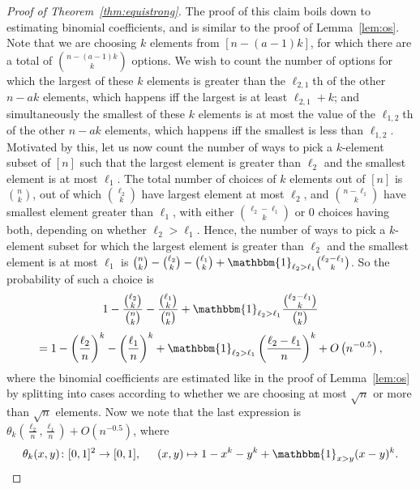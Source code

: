 \documentclass{amsart}
\theoremstyle{definition}
\begin{document}
\begin{proof}[Proof of Theorem~\ref{thm:equistrong}]
The proof of this claim boils down to estimating binomial coefficients, and is similar to the proof of Lemma~\ref{lem:os}. Note that we are choosing $k$ elements from $[n-(a-1)k]$, for which there are a total of $\binom{n-(a-1)k}{k}$ options. We wish to count the number of options for which the largest of these $k$ elements is greater than the $\ell_{2,1}$th of the other $n-ak$ elements, which happens iff the largest is at least $\ell_{2,1}+k$; and simultaneously the smallest of these $k$ elements is at most the value of the $\ell_{1,2}$th of the other $n-ak$ elements, which happens iff the smallest is less than $\ell_{1,2}$. Motivated by this, let us now count the number of ways to pick a $k$-element subset of $[n]$ such that the largest element is greater than $\ell_2$ and the smallest element is at most $\ell_1$. The total number of choices of $k$ elements out of $[n]$ is $\binom{n}{k}$, out of which $\binom{\ell_2}{k}$ have largest element at most $\ell_2$, and $\binom{n-\ell_1}{k}$ have smallest element greater than $\ell_1$, with either $\binom{\ell_2-\ell_1}{k}$ or $0$ choices having both, depending on whether $\ell_2>\ell_1$. Hence, the number of ways to pick a $k$-element subset for which the largest element is greater than $\ell_2$ and the smallest element is at most $\ell_1$ is
$\binom{n}{k}-\binom{\ell_2}{k}-\binom{\ell_1}{k}+\mathbbm{1}_{\ell_2>\ell_1}\binom{\ell_2-\ell_1}{k}$. So the probability of such a choice is
\[1-\frac{\binom{\ell_2}{k}}{\binom{n}{k}}-\frac{\binom{\ell_1}{k}}{\binom{n}{k}}+\mathbbm{1}_{\ell_2>\ell_1}\frac{\binom{\ell_2-\ell_1}{k}}{\binom{n}{k}}\]
\[=1-\left(\frac{\ell_2}{n}\right)^k-\left(\frac{\ell_1}{n}\right)^k+\mathbbm{1}_{\ell_2>\ell_1}\left(\frac{\ell_2-\ell_1}{n}\right)^k+O\left(n^{-0.5}\right),\]
where the binomial coefficients are estimated like in the proof of Lemma~\ref{lem:os} by splitting into cases according to whether we are choosing at most $\sqrt{n}$ or more than $\sqrt{n}$ elements. Now we note that the last expression is $\theta_k\left(\frac{\ell_2}{n}, \frac{\ell_1}{n}\right)+O\left(n^{-0.5}\right)$, where
\[\theta_k(x,y)\colon [0,1]^2\to [0,1], \hspace{5mm} (x,y)\mapsto 1-x^k-y^k+\mathbbm{1}_{x>y}(x-y)^k.\]


\end{proof}
\end{document}
